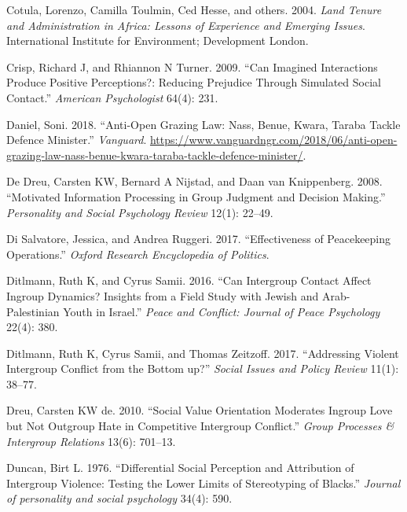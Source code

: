 \documentclass[11pt]{article}
\begin{document}
\leavevmode\hypertarget{ref-cotula2004land}{}%
Cotula, Lorenzo, Camilla Toulmin, Ced Hesse, and others. 2004.
\emph{Land Tenure and Administration in Africa: Lessons of Experience
and Emerging Issues}. International Institute for Environment;
Development London.

\leavevmode\hypertarget{ref-crisp2009imagined}{}%
Crisp, Richard J, and Rhiannon N Turner. 2009. ``Can Imagined
Interactions Produce Positive Perceptions?: Reducing Prejudice Through
Simulated Social Contact.'' \emph{American Psychologist} 64(4): 231.

\leavevmode\hypertarget{ref-daniel2018anti}{}%
Daniel, Soni. 2018. ``Anti-Open Grazing Law: Nass, Benue, Kwara, Taraba
Tackle Defence Minister.'' \emph{Vanguard}.
\url{https://www.vanguardngr.com/2018/06/anti-open-grazing-law-nass-benue-kwara-taraba-tackle-defence-minister/}.

\leavevmode\hypertarget{ref-de2008motivated}{}%
De Dreu, Carsten KW, Bernard A Nijstad, and Daan van Knippenberg. 2008.
``Motivated Information Processing in Group Judgment and Decision
Making.'' \emph{Personality and Social Psychology Review} 12(1): 22--49.

\leavevmode\hypertarget{ref-di2017effectiveness}{}%
Di Salvatore, Jessica, and Andrea Ruggeri. 2017. ``Effectiveness of
Peacekeeping Operations.'' \emph{Oxford Research Encyclopedia of
Politics}.

\leavevmode\hypertarget{ref-ditlmann2016can}{}%
Ditlmann, Ruth K, and Cyrus Samii. 2016. ``Can Intergroup Contact Affect
Ingroup Dynamics? Insights from a Field Study with Jewish and
Arab-Palestinian Youth in Israel.'' \emph{Peace and Conflict: Journal of
Peace Psychology} 22(4): 380.

\leavevmode\hypertarget{ref-ditlmann2017addressing}{}%
Ditlmann, Ruth K, Cyrus Samii, and Thomas Zeitzoff. 2017. ``Addressing
Violent Intergroup Conflict from the Bottom up?'' \emph{Social Issues
and Policy Review} 11(1): 38--77.

\leavevmode\hypertarget{ref-dreu2010social}{}%
Dreu, Carsten KW de. 2010. ``Social Value Orientation Moderates Ingroup
Love but Not Outgroup Hate in Competitive Intergroup Conflict.''
\emph{Group Processes \& Intergroup Relations} 13(6): 701--13.

\leavevmode\hypertarget{ref-duncan1976differential}{}%
Duncan, Birt L. 1976. ``Differential Social Perception and Attribution
of Intergroup Violence: Testing the Lower Limits of Stereotyping of
Blacks.'' \emph{Journal of personality and social psychology} 34(4):
590.
\end{document}
